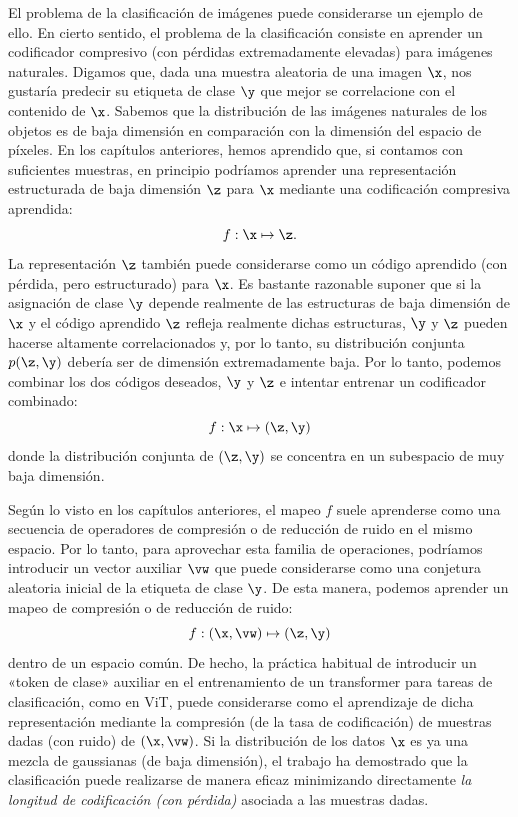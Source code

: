 \documentclass[../../book-main_es.tex]{subfiles}
\begin{document}
El problema de la clasificación de imágenes puede considerarse un ejemplo de ello.
En cierto sentido, el problema de la clasificación consiste en aprender un
codificador compresivo (con pérdidas extremadamente elevadas) para imágenes naturales. Digamos que, dada
una muestra aleatoria de una imagen $\x$, nos gustaría predecir su etiqueta de clase
$\y$ que mejor se correlacione con el contenido de $\x$. Sabemos que la
distribución de las imágenes naturales de los objetos es de baja dimensión en comparación
con la dimensión del espacio de píxeles. En los capítulos anteriores,
hemos aprendido que, si contamos con suficientes muestras, en principio podríamos
aprender una representación estructurada de baja dimensión $\z$ para $\x$
mediante una codificación compresiva aprendida:
\begin{equation}
    f: \x \mapsto \z.
\end{equation}
La representación $\z$ también puede considerarse como un código aprendido (con pérdida, pero
estructurado) para $\x$. Es bastante razonable suponer que si
la asignación de clase $\y$ depende realmente de las estructuras de baja dimensión
de $\x$ y el código aprendido $\z$ refleja realmente dichas
estructuras, $\y$ y $\z$ pueden hacerse altamente correlacionados y, por lo tanto,
su distribución conjunta $p(\z, \y)$ debería ser de dimensión extremadamente
baja. Por lo tanto, podemos combinar los dos códigos deseados, $\y$
y $\z$ e intentar entrenar un codificador combinado: 
\begin{equation}
    f: \x \mapsto (\z, \y)
\end{equation}
donde la distribución conjunta de $(\z, \y)$ se concentra en un subespacio de muy baja dimensión.

Según lo visto en los capítulos anteriores, el mapeo $f$ suele
aprenderse como una secuencia de operadores de compresión o de reducción de ruido en el
mismo espacio. Por lo tanto, para aprovechar esta familia de operaciones, podríamos
introducir un vector auxiliar $\vw$ que puede considerarse como una
conjetura aleatoria inicial de la etiqueta de clase $\y$. De esta manera, podemos aprender un
mapeo de compresión o de reducción de ruido:
\begin{equation}\label{eq:classifier-with-class-token}
    f: (\x, \vw) \mapsto (\z, \y)
\end{equation}
dentro de un espacio común. De hecho, la práctica habitual de introducir un
«token de clase» auxiliar en el entrenamiento de un transformer para
tareas de clasificación, como en ViT, puede considerarse como el aprendizaje de dicha
representación mediante la compresión (de la tasa de codificación) de muestras dadas (con ruido)
de $(\x, \vw)$. Si la distribución de los datos $\x$ es
ya una mezcla de gaussianas (de baja dimensión), el trabajo
\cite{wright2008classification} ha demostrado que la clasificación puede
realizarse de manera eficaz minimizando directamente {\em la longitud de codificación 
(con pérdida)} asociada a las muestras dadas.
\end{document}
